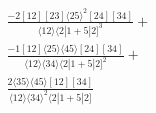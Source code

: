 \documentclass[varwidth, border=5pt]{standalone}
\begin{document}
\begin{my}
$\begin{gathered}
\scriptscriptstyle\frac{-2[12][23]⟨25⟩^2[24][34]}{⟨12⟩⟨2|1+5|2]^3}+\\
\scriptscriptstyle\frac{-1[12]⟨25⟩⟨45⟩[24][34]}{⟨12⟩⟨34⟩⟨2|1+5|2]^2}+\\
\scriptscriptstyle\frac{2⟨35⟩⟨45⟩[12][34]}{⟨12⟩⟨34⟩^2⟨2|1+5|2]}\phantom{+}
\end{gathered}$
\end{my}
\end{document}
